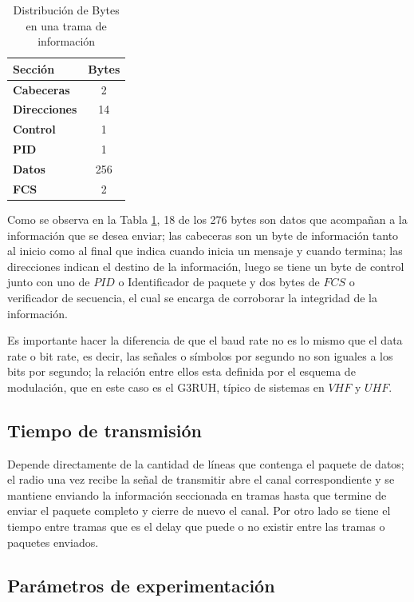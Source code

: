 \begin{table}[H]
\centering
\caption{Distribución de Bytes en una trama de información }
\label{trama}
\begin{tabular}{lc}
\toprule
\textbf{Sección}     & \textbf{Bytes} \\ \midrule
\textbf{Cabeceras}   & 2              \\
\textbf{Direcciones} & 14             \\
\textbf{Control}     & 1              \\
\textbf{PID}         & 1              \\
\textbf{Datos}       & 256            \\
\textbf{FCS}         & 2              \\ \bottomrule
\end{tabular}
\end{table}

Como se observa en la Tabla \ref{trama}, 18 de los 276 bytes son datos que acompañan a la información que se desea enviar; las cabeceras son un byte de información tanto al inicio como al final que indica cuando inicia un mensaje y cuando termina; las direcciones indican el destino de la información, luego se tiene un byte de control junto con uno de $PID$ o Identificador de paquete y dos bytes de $FCS$ o verificador de secuencia, el cual se encarga de corroborar la integridad de la información.


Es importante hacer la diferencia de que el baud rate no es lo mismo que el data rate o bit rate, es decir, las señales o símbolos por segundo no son iguales a los bits por segundo; la relación entre ellos esta definida por el esquema de modulación, que en este caso es el G3RUH, típico de sistemas en $VHF$ y $UHF$.

\subsection{Tiempo de transmisión} 

Depende directamente de la cantidad de líneas que contenga el paquete de datos; el radio una vez recibe la señal de transmitir abre el canal correspondiente y se mantiene enviando la información seccionada en tramas hasta que termine de enviar el paquete completo y cierre de nuevo el canal. Por otro lado se tiene el tiempo entre tramas que es el delay que puede o no existir entre las tramas o paquetes enviados.

\subsection{Parámetros de experimentación}\label{prueba}

